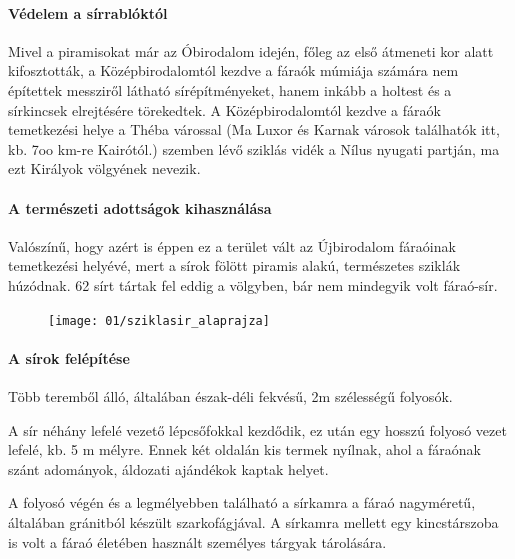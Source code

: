 \paragraph{Védelem a sírrablóktól} Mivel a piramisokat már az Óbirodalom idején, főleg az első átmeneti kor alatt kifosztották, a Középbirodalomtól kezdve a fáraók múmiája számára nem építettek messziről látható sírépítményeket, hanem inkább a holtest és a sírkincsek elrejtésére törekedtek. A Középbirodalomtól kezdve a fáraók temetkezési helye a Théba várossal (Ma Luxor és Karnak városok találhatók itt, kb. 7oo km-re Kairótól.) szemben lévő sziklás vidék a Nílus nyugati partján, ma ezt Királyok völgyének nevezik.

\paragraph{A természeti adottságok kihasználása}Valószínű, hogy azért is éppen ez a terület vált az Újbirodalom fáraóinak temetkezési helyévé, mert a sírok fölött piramis alakú, természetes sziklák húzódnak. 62 sírt tártak fel eddig a völgyben, bár nem mindegyik volt fáraó-sír.

\begin{figure}
	\begin{tcolorbox}[enhanced,colframe=gray!50!white,
		colbacktitle=gray!15!white,
		coltitle=gray!50!black,
		borderline={0.5mm}{0mm}{gray!15!white},
		borderline={0.5mm}{0mm}{gray!50!white,dashed},
		attach boxed title to top center={yshift=-2mm},
		boxed title style={boxrule=0.4pt},
		title=Sziklasír felépítése]{
			\texttt{[image: 01/sziklasir\_alaprajza]}}
	\end{tcolorbox}
\end{figure}

\paragraph{A sírok felépítése} Több teremből álló, általában észak-déli fekvésű, 2m szélességű folyosók.

A sír néhány lefelé vezető lépcsőfokkal kezdődik, ez után egy hosszú folyosó vezet lefelé, kb. 5 m mélyre. Ennek két oldalán kis termek nyílnak, ahol a fáraónak szánt adományok, áldozati ajándékok kaptak helyet. 

A folyosó végén és a legmélyebben található a sírkamra a fáraó nagyméretű, általában gránitból készült szarkofágjával. A sírkamra mellett egy kincstárszoba is volt a fáraó életében használt személyes tárgyak tárolására.

